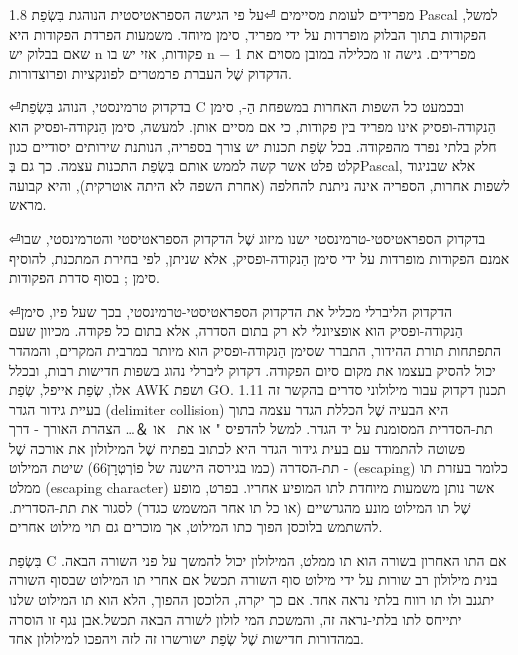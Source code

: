 \begin{טבלא}[!htbp]
        1.8 מפרידים לעומת מסיימים
⏎על פי הגישה הספראטיסטית הנוהגת בִּשְׂפַת Pascal למשל, הפקודות בתוך הבלוק מופרדות על ידי מפריד, סימן מיוחד. משמעות הפרדת הפקודות היא שאם בבלוק יש n פקודות, אזי יש בו n − 1 מפרידים.
        גישה זו מכלילה במובן מסוים את הדקדוק שֶׁל העברת פרמטרים לפונקציות ופרוצדורות.

⏎בדקדוק טרמינסטי, הנוהג בִּשְׂפַת C ובכמעט כל השפות האחרות במשפחת הַ-{}, סימן הַנקודה-ופסיק אינו מפריד בין פקודות, כי אם מסיים אותן. למעשה, סימן הַנקודה-ופסיק הוא חלק בלתי נפרד מהפקודה. בכל שְׂפַת תכנות יש צורך בספריה, הנותנת שירותים יסודיים כגון קלט פלט אשר קשה לממש אותם בִּשְׂפַת התכנות עצמה. כך גם בְּPascal, אלא שבניגוד לשפות אחרות, הספריה אינה ניתנת להחלפה (אחרת השפה לא היתה אוטרקית), והיא קבועה מראש.

⏎בדקדוק הספראטיסטי-טרמינסטי ישנו מיזוג שֶׁל הדקדוק הספראטיסטי והטרמינסטי, שבו אמנם הפקודות מופרדות על ידי סימן הַנקודה-ופסיק, אלא שניתן, לפי בחירת המתכנת, להוסיף סימן ; בסוף סדרת הפקודות.

⏎הדקדוק הליברלי מכליל את הדקדוק הספראטיסטי-טרמינסטי, בכך שעל פיו, סימן הַנקודה-ופסיק הוא אופציונלי לא רק בתום הסדרה, אלא בתום כל פקודה.
        מכיוון שעם התפתחות תורת ההידור, התברר שסימן הַנקודה-ופסיק הוא מיותר במרבית המקרים, והמהדר יכול להסיק בעצמו את מקום סיום הפקודה.
        דקדוק ליברלי נהוג בשפות חדישות רבות, ובכלל אלו, שְׂפַת אייפל, שְׂפַת AWK ושפת GO.
        1.11 תכנון דקדוק עבור מילולוני סדרים
        בהקשר זה בעיית גידור הגדר (delimiter collision) היא הבעיה שֶׁל הכללת הגדר עצמה בתוך תת-הסדרית המסומנת על יד הגדר. למשל להדפיס " או את \ או ＆…
        הצהרת האורך - דרך פשוטה להתמודד עם בעית גידור הגדר היא לכתוב בפתיח שֶׁל המילולון את אורכה שֶׁל תת-הסדרה (כמו בגירסה הישנה של פוֹרְטְרָן66)
        שיטת המילוט - (escaping) כלומר בעזרת תו ממלט (escaping character) אשר נותן משמעות מיוחדת לתו המופיע אחריו. בפרט, מופע שֶׁל תו המילוט מונע מהגרשיים (או כל תו אחר המשמש כגדר) לסגור את תת-הסדרית. להשתמש בלוכסן הפוך כתו המילוט, אך מוכרים גם תוי מילוט אחרים.

        בִּשְׂפַת C אם התו האחרון בשורה הוא תו ממלט, המילולון יכול להמשך על פני השורה הבאה. בנית מילולון רב שורות על ידי מילוט סוף השורה תכשל אם אחרי תו המילוט שבסוף השורה יתגנב ולו תו רווח בלתי נראה אחד. אם כך יקרה, הלוכסן ההפוך, הלא הוא תו המילוט שלנו יתייחס לתו בלתי-נראה זה, והמשכת המי לולון לשורה הבאה תכשל.אבן נגף זו הוסרה במהדורות חדישות שֶׁל שְׂפַת ישורשרו זה לזה ויהפכו למילולון אחד.


\end{טבלא}
